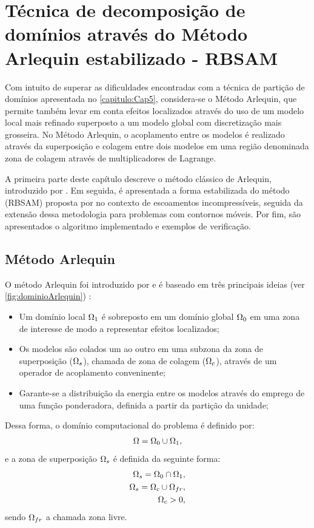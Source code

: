 \chapter[Método Arlequin estabilizado]{Técnica de decomposição de domínios através do Método Arlequin estabilizado - RBSAM} \label{capitulo:Cap6}

Com intuito de superar as dificuldades encontradas com a técnica de partição de domínios apresentada no \autoref{capitulo:Cap5}, considera-se o Método Arlequin, que permite também levar em conta efeitos localizados através do uso de um modelo local mais refinado superposto a um modelo global com discretização mais grosseira. No Método Arlequin, o acoplamento entre os modelos é realizado através da superposição e colagem entre dois modelos em uma região denominada zona de colagem através de multiplicadores de Lagrange.

A primeira parte deste capítulo descreve o método clássico de Arlequin, introduzido por . Em seguida, é apresentada a forma estabilizada do método (RBSAM) proposta por  no contexto de escoamentos incompressíveis, seguida da extensão dessa metodologia para problemas com contornos móveis. Por fim, são apresentados o algoritmo implementado e exemplos de verificação.

\section{Método Arlequin}

O método Arlequin foi introduzido por  e é baseado em três principais ideias (ver \autoref{fig:dominioArlequin}) \cite{DhiaR:2005}:
\begin{itemize}
	\item Um domínio local $\Omega_1$ é sobreposto em um domínio global  $\Omega_0$ em uma zona de interesse de modo a representar efeitos localizados;
	\item Os modelos são colados um ao outro em uma subzona da zona de superposição ($\Omega_s$), chamada de zona de colagem ($\Omega_c$), através de um operador de acoplamento conveninente;
	\item  Garante-se a distribuição da energia entre os modelos através do emprego de uma função ponderadora, definida a partir da partição da unidade;
\end{itemize}

Dessa forma, o domínio computacional do problema é definido por:
\begin{align}
	\Omega = \Omega_0 \cup \Omega_1, 
\end{align}
\noindent e a zona de superposição $\Omega_s$ é definida da seguinte forma:
\begin{align}
	\Omega_s = \Omega_0 \cap \Omega_1, \\
	\Omega_s = \Omega_c \cup \Omega_{fr}, \\
	\Omega_c > 0, 
\end{align}
\noindent sendo  $\Omega_{fr}$ a chamada zona livre.

